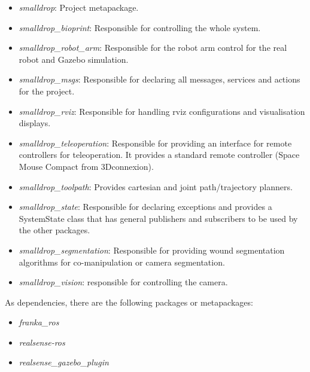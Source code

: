 \begin{itemize}
    \item \textit{smalldrop}: Project metapackage.
    \item \textit{smalldrop\_bioprint}: Responsible for controlling the whole system.
    \item \textit{smalldrop\_robot\_arm}: Responsible for the robot arm control for the real robot and Gazebo simulation.
    \item \textit{smalldrop\_msgs}: Responsible for declaring all messages, services and actions for the project.
    \item \textit{smalldrop\_rviz}: Responsible for handling rviz configurations and visualisation displays.
    \item \textit{smalldrop\_teleoperation}: Responsible for providing an interface for remote controllers for teleoperation. It provides a standard remote controller (Space Mouse Compact from 3Dconnexion).
    \item \textit{smalldrop\_toolpath}: Provides cartesian and joint path/trajectory planners.
    \item \textit{smalldrop\_state}: Responsible for declaring exceptions and provides a SystemState class that has general publishers and subscribers to be used by the other packages.
    \item \textit{smalldrop\_segmentation}: Responsible for providing wound segmentation algorithms for co-manipulation or camera segmentation.
    \item \textit{smalldrop\_vision}: responsible for controlling the camera.
\end{itemize}

As dependencies, there are the following packages or metapackages:

\begin{itemize}
    \item \textit{franka\_ros}
    \item \textit{realsense-ros}
    \item \textit{realsense\_gazebo\_plugin}
\end{itemize}

